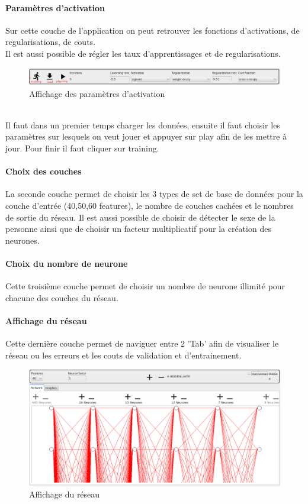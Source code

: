 \documentclass[11pt]{article}
\begin{document}
\paragraph{Param\`etres d'activation}
Sur cette couche de l'application on peut retrouver les fonctions
d'activations, de regularisations, de couts.\\
Il est aussi possible de r\'egler les taux d'apprentissages et de
regularisations.
\begin{figure}[htp]
	\centering
	\includegraphics[scale=.4]{img/parametersLayer.png}
	\caption{Affichage des param\`etres d'activation}
\end{figure} \\

Il faut dans un premier temps charger les donn\'ees, ensuite il faut choisir
les param\`etres sur lesquels on veut jouer et appuyer sur play afin de les
mettre \`a jour. Pour finir il faut cliquer sur training.\\

\paragraph{Choix des couches}
La seconde couche permet de choisir les 3 types de set de base de donn\'ees
pour la couche d'entr\'ee (40,50,60 features), le nombre de couches cach\'ees
et le nombres de sortie du r\'eseau. Il est aussi possible de choisir de
d\'etecter le sexe de la personne ainsi que de choisir un facteur
multiplicatif pour la cr\'eation des neurones.

\paragraph{Choix du nombre de neurone}
Cette troisi\`eme couche permet de choisir un nombre de neurone illimit\'e
pour chacune des couches du r\'eseau.
\paragraph{Affichage du r\'eseau}
Cette derni\`ere couche permet de naviguer entre 2 'Tab' afin de visualiser le
r\'eseau ou les erreurs et les couts de validation et d'entrainement.\\
\begin{figure}[htp]
	\centering
	\includegraphics[scale=.25]{img/NetworkGraphics.png}
	\caption{Affichage du r\'eseau}
\end{figure} \\
\end{document}
